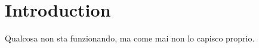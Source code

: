 \documentclass{article}
\begin{document}
    \section{Introduction}
    Qualcosa non sta funzionando, ma come mai non lo capisco proprio.
\end{document}
